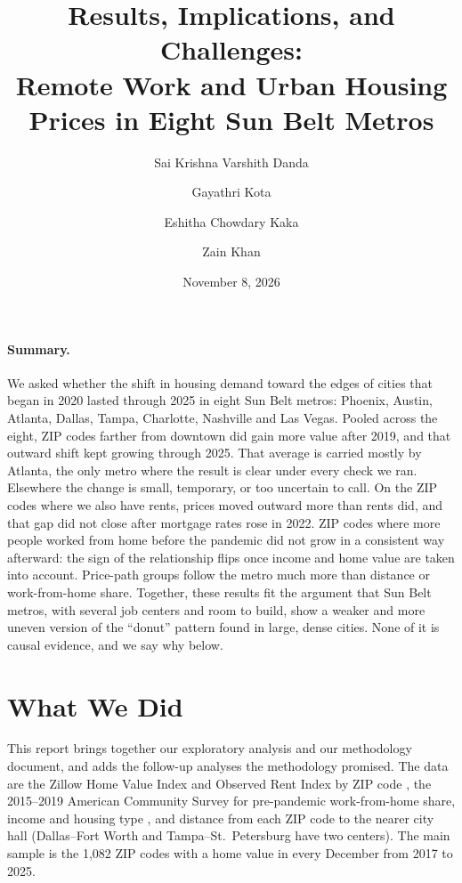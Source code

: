 \documentclass[11pt]{article}
\title{Results, Implications, and Challenges:\\ Remote Work and Urban Housing Prices in Eight Sun Belt Metros}
\author[1]{Sai Krishna Varshith Danda}
\author[1]{Gayathri Kota}
\author[1]{Eshitha Chowdary Kaka}
\author[1]{Zain Khan}
\affil[1]{Arizona State University, Tempe, AZ 85281, USA}
\date{November 8, 2026}
\begin{document}
\maketitle

\paragraph{Summary.} We asked whether the shift in housing demand toward the edges of cities that began in 2020 lasted through
2025 in eight Sun Belt metros: Phoenix, Austin, Atlanta, Dallas, Tampa, Charlotte, Nashville and Las Vegas. Pooled across the eight,
ZIP codes farther from downtown did gain more value after 2019, and that outward shift kept growing through 2025. That average is carried
mostly by Atlanta, the only metro where the result is clear under every check we ran. Elsewhere the change is small, temporary, or
too uncertain to call. On the ZIP codes where we also have rents, prices moved outward more than rents did, and that gap did not close
after mortgage rates rose in 2022. ZIP codes where more people worked from home before the pandemic did not grow in a consistent way
afterward: the sign of the relationship flips once income and home value are taken into account. Price-path groups follow the metro
much more than distance or work-from-home share. Together, these results fit the argument that Sun Belt metros, with several job
centers and room to build, show a weaker and more uneven version of the ``donut'' pattern found in large, dense cities. None of it is
causal evidence, and we say why below.

\section{What We Did}

This report brings together our exploratory analysis and our methodology document, and adds the follow-up analyses the
methodology promised. The data are the Zillow Home Value Index and Observed Rent Index by ZIP code \cite{zillow}, the 2015--2019
American Community Survey for pre-pandemic work-from-home share, income and housing type \cite{acs}, and distance from each ZIP
code to the nearer city hall (Dallas--Fort Worth and Tampa--St.\ Petersburg have two centers). The main sample is the 1,082 ZIP codes
with a home value in every December from 2017 to 2025.
\end{document}
